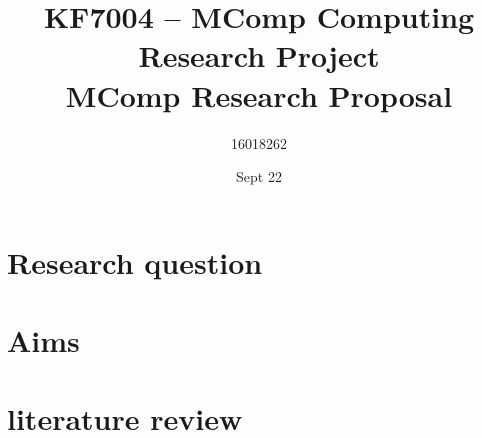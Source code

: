 \documentclass[10pt]{article}
\title{KF7004 – MComp Computing Research Project \\ MComp Research Proposal}
\author{16018262}
\date{Sept 22}
\begin{document}
\maketitle

\section{Research question}

\section{Aims}

\section{literature review}

\end{document}
